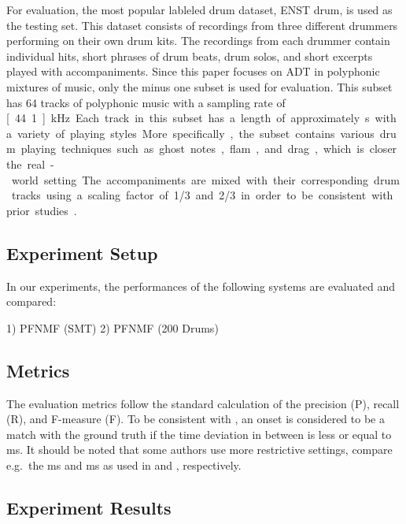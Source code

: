 \documentclass{article}
\begin{document}
For evaluation, the most popular lableled drum dataset, ENST drum\cite{Gillet2006}, is used as the testing set. This dataset consists of recordings from three different drummers performing on their own drum kits. The recordings from each drummer contain individual hits, short phrases of drum beats, drum solos, and short excerpts played with accompaniments. Since this paper focuses on ADT in polyphonic mixtures of music, only the minus one subset is used for evaluation. This subset has 64 tracks of polyphonic music with a sampling rate of \unit[44.1]{kHz}. Each track in this subset has a length of approximately \unit[70]{s} with a variety of playing styles. More specifically, the subset contains various drum playing techniques such as ghost notes, flam, and drag, which is closer the real-world setting. The accompaniments are mixed with their corresponding drum tracks using a scaling factor of 1/3 and 2/3 in order to be consistent with prior studies \cite{Paulus2009a, Wu2015a, Southall2016}.

\subsection{Experiment Setup}
In our experiments, the performances of the following systems are evaluated and compared: 


1) PFNMF (SMT) 2) PFNMF (200 Drums) 




\subsection{Metrics}
The evaluation metrics follow the standard calculation of the precision (P), recall (R), and F-measure (F). To be consistent with \cite{Gillet2008, Wu2015a, Southall2016}, an onset is considered to be a match with the ground truth if the time deviation in between is less or equal to \unit[50]{ms}. It should be noted that some authors use more restrictive settings, compare e.g.\ the \unit[30]{ms} and \unit[20]{ms} as used in \cite{Paulus2009a} and \cite{Vogl2017}, respectively.  

\subsection{Experiment Results}



 
\end{document}

